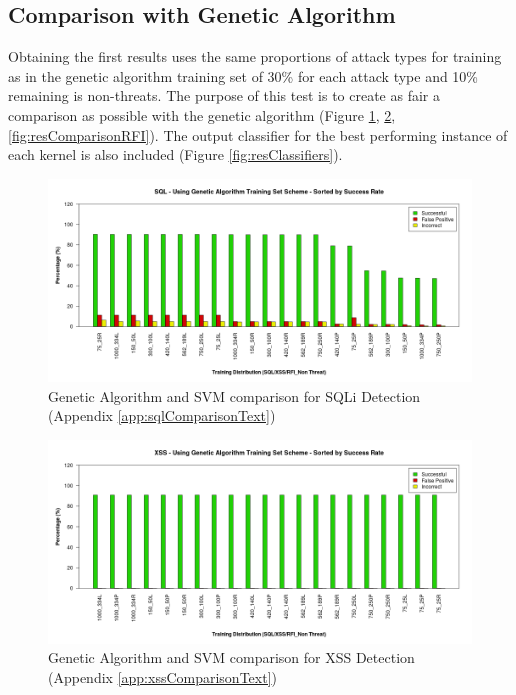 \newpage
\subsection{Comparison with Genetic Algorithm} \label{sec:resComparison}

Obtaining the first results uses the same proportions of attack types for training as in the genetic algorithm training set of 30\% for each attack type and 10\% remaining is non-threats. The purpose of this test is to create as fair a comparison as possible with the genetic algorithm (Figure \ref{fig:resComparisonSQL}, \ref{fig:resComparisonXSS},\ref{fig:resComparisonRFI}).  The output classifier for the best performing instance of each kernel is also included (Figure \ref{fig:resClassifiers}).

\begin{figure}[H]
	\centering
	\includegraphics[width=450px]{./assets/results/svm/comparison/Results_SQL.png}
	\caption{Genetic Algorithm and SVM comparison for SQLi Detection (Appendix \ref{app:sqlComparisonText})}
	\label{fig:resComparisonSQL}
\end{figure}

\newpage
\begin{figure}[H]
	\centering
	\includegraphics[width=450px]{./assets/appendix/fullresults/svm/comparison/Results_XSS.png}
	\caption{Genetic Algorithm and SVM comparison for XSS Detection (Appendix \ref{app:xssComparisonText})}
	\label{fig:resComparisonXSS}
\end{figure}

